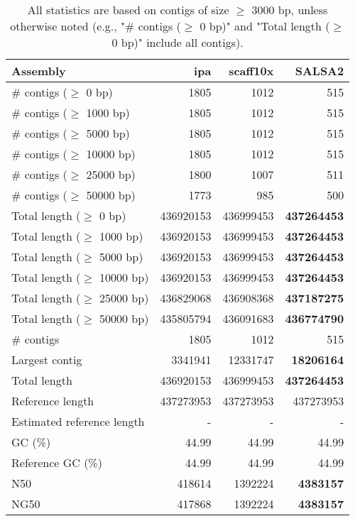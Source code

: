 \documentclass[12pt,a4paper]{article}
\begin{document}
\begin{table}[ht]
\begin{center}
\caption{All statistics are based on contigs of size $\geq$ 3000 bp, unless otherwise noted (e.g., "\# contigs ($\geq$ 0 bp)" and "Total length ($\geq$ 0 bp)" include all contigs).}
\begin{tabular}{|l*{3}{|r}|}
\hline
Assembly & ipa & scaff10x & SALSA2 \\ \hline
\# contigs ($\geq$ 0 bp) & 1805 & 1012 & 515 \\ \hline
\# contigs ($\geq$ 1000 bp) & 1805 & 1012 & 515 \\ \hline
\# contigs ($\geq$ 5000 bp) & 1805 & 1012 & 515 \\ \hline
\# contigs ($\geq$ 10000 bp) & 1805 & 1012 & 515 \\ \hline
\# contigs ($\geq$ 25000 bp) & 1800 & 1007 & 511 \\ \hline
\# contigs ($\geq$ 50000 bp) & 1773 & 985 & 500 \\ \hline
Total length ($\geq$ 0 bp) & 436920153 & 436999453 & {\bf 437264453} \\ \hline
Total length ($\geq$ 1000 bp) & 436920153 & 436999453 & {\bf 437264453} \\ \hline
Total length ($\geq$ 5000 bp) & 436920153 & 436999453 & {\bf 437264453} \\ \hline
Total length ($\geq$ 10000 bp) & 436920153 & 436999453 & {\bf 437264453} \\ \hline
Total length ($\geq$ 25000 bp) & 436829068 & 436908368 & {\bf 437187275} \\ \hline
Total length ($\geq$ 50000 bp) & 435805794 & 436091683 & {\bf 436774790} \\ \hline
\# contigs & 1805 & 1012 & 515 \\ \hline
Largest contig & 3341941 & 12331747 & {\bf 18206164} \\ \hline
Total length & 436920153 & 436999453 & {\bf 437264453} \\ \hline
Reference length & 437273953 & 437273953 & 437273953 \\ \hline
Estimated reference length & - & - & - \\ \hline
GC (\%) & 44.99 & 44.99 & 44.99 \\ \hline
Reference GC (\%) & 44.99 & 44.99 & 44.99 \\ \hline
N50 & 418614 & 1392224 & {\bf 4383157} \\ \hline
NG50 & 417868 & 1392224 & {\bf 4383157} \\ \hline

\end{tabular}
\end{center}
\end{table}
\end{document}
